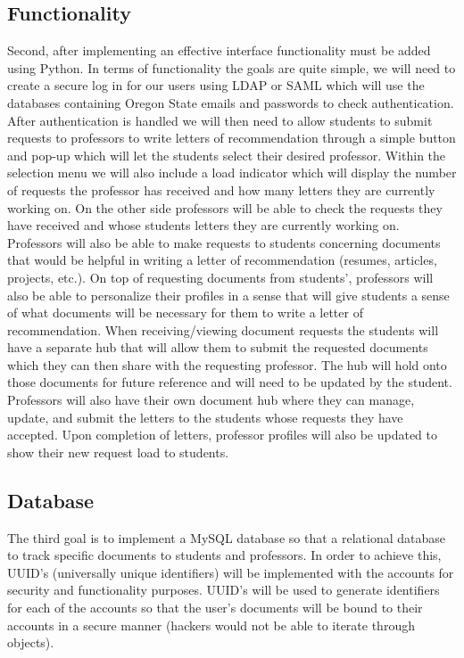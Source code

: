 \documentclass[compsoc, draftclsnofoot, onecolumn, letterpaper, 10pt]{IEEEtran}
\begin{document}
\subsection{Functionality}
Second, after implementing an effective interface functionality must be added using Python. In terms of functionality the goals are quite simple, we will need to create a secure log in for our users using LDAP or SAML which will use the databases containing Oregon State emails and passwords to check authentication. After authentication is handled we will then need to allow students to submit requests to professors to write letters of recommendation through a simple button and pop-up which will let the students select their desired professor. Within the selection menu we will also include a load indicator which will display the number of requests the professor has received and how many letters they are currently working on. On the other side professors will be able to check the requests they have received and whose students letters they are currently working on. Professors will also be able to make requests to students concerning documents that would be helpful in writing a letter of recommendation (resumes, articles, projects, etc.). On top of requesting documents from students’, professors will also be able to personalize their profiles in a sense that will give students a sense of what documents will be necessary for them to write a letter of recommendation.  When receiving/viewing document requests the students will have a separate hub that will allow them to submit the requested documents which they can then share with the requesting professor. The hub will hold onto those documents for future reference and will need to be updated by the student. Professors will also have their own document hub where they can manage, update, and submit the letters to the students whose requests they have accepted. Upon completion of letters, professor profiles will also be updated to show their new request load to students.

\subsection{Database}
The third goal is to implement a MySQL database so that a relational database to track specific documents to students and professors. In order to achieve this, UUID’s (universally unique identifiers) will be implemented with the accounts for security and functionality purposes. UUID’s will be used to generate identifiers for each of the accounts so that the user's documents will be bound to their accounts in a secure manner (hackers would not be able to iterate through objects).
\end{document}

